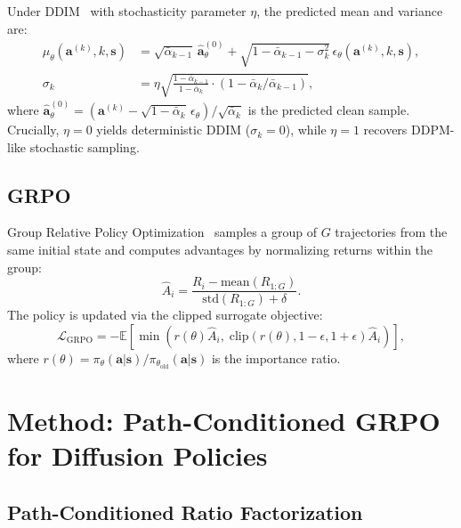 \documentclass{article}
\newcommand{\E}{\mathbb{E}}
\newcommand{\ba}{\mathbf{a}}
\newcommand{\bs}{\mathbf{s}}
\begin{document}
Under DDIM~\cite{song2020ddim} with stochasticity parameter $\eta$, the predicted mean and variance are:
\begin{align}
\mu_\theta(\ba^{(k)}, k, \bs) &= \sqrt{\bar\alpha_{k-1}}\, \hat{\ba}^{(0)}_\theta + \sqrt{1 - \bar\alpha_{k-1} - \sigma_k^2}\, \epsilon_\theta(\ba^{(k)}, k, \bs), \\
\sigma_k &= \eta \sqrt{\frac{1 - \bar\alpha_{k-1}}{1 - \bar\alpha_k} \cdot (1 - \bar\alpha_k / \bar\alpha_{k-1})},
\end{align}
where $\hat{\ba}^{(0)}_\theta = (\ba^{(k)} - \sqrt{1-\bar\alpha_k}\,\epsilon_\theta) / \sqrt{\bar\alpha_k}$ is the predicted clean sample.
Crucially, $\eta = 0$ yields deterministic DDIM ($\sigma_k = 0$), while $\eta = 1$ recovers DDPM-like stochastic sampling.

\subsection{GRPO}

Group Relative Policy Optimization~\cite{shao2024deepseekmath} samples a group of $G$ trajectories from the same initial state and computes advantages by normalizing returns within the group:
\begin{equation}
\hat{A}_i = \frac{R_i - \text{mean}(R_{1:G})}{\text{std}(R_{1:G}) + \delta}.
\end{equation}
The policy is updated via the clipped surrogate objective:
\begin{equation}
\mathcal{L}_\text{GRPO} = -\E\left[\min\left(r(\theta)\hat{A}_i,\; \text{clip}(r(\theta), 1-\epsilon, 1+\epsilon)\hat{A}_i\right)\right],
\end{equation}
where $r(\theta) = \pi_\theta(\ba|\bs) / \pi_{\theta_\text{old}}(\ba|\bs)$ is the importance ratio.


\section{Method: Path-Conditioned GRPO for Diffusion Policies}
\label{sec:method}

\subsection{Path-Conditioned Ratio Factorization}
\label{sec:ratio}
\end{document}
